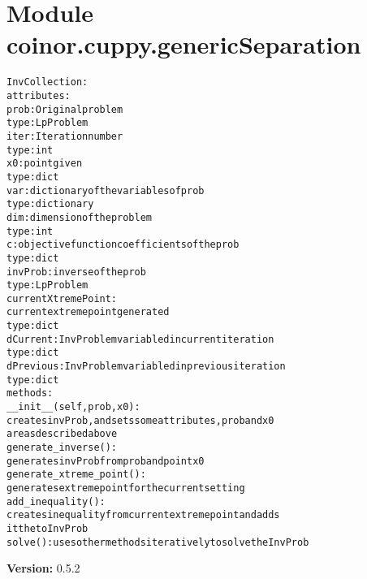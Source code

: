 %
%
%


\section{Module coinor.cuppy.genericSeparation}

    \label{coinor:cuppy:genericSeparation}
\begin{alltt}

InvCollection:
    attributes:
        prob:        Original problem
                     type: LpProblem
        iter:        Iteration number
                     type: int
        x0:          point given
                     type: dict
        var:         dictionary of the variables of prob
                     type: dictionary
        dim:         dimension of the problem
                     type: int
        c:           objective function coefficients of the prob
                     type: dict
        invProb:     inverse of the prob
                     type: LpProblem
        currentXtremePoint:
                     current extreme point generated
                     type: dict
        dCurrent:    InvProblem variable d in current iteration
                     type: dict
        dPrevious:   InvProblem variable d in previous iteration
                     type: dict
    methods:
        \_\_init\_\_(self,prob,x0):
                     creates invProb, and sets some attributes, prob and x0
                     are as described above
        generate\_inverse():
                     generates invProb from prob and point x0
        generate\_xtreme\_point():
                     generates extreme point for the current setting
        add\_inequality():
                     creates inequality from current extreme point and adds
                     it the to InvProb
        solve():     uses other methods iteratively to solve the InvProb
\end{alltt}

\textbf{Version:} 0.5.2



